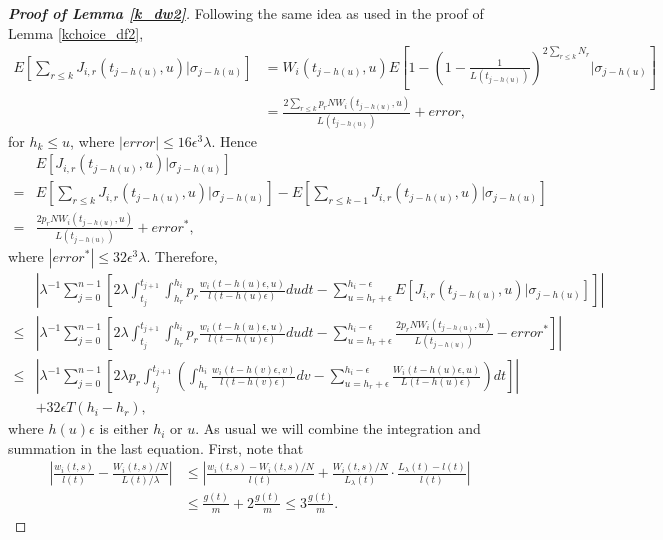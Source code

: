 \documentclass[12pt]{article}
\numberwithin{equation}{section}  %
\begin{document}
\begin{proof}[\textbf{Proof of Lemma \ref{k_dw2}}]
Following the same idea as used in the proof of Lemma \ref{kchoice_df2},
{\footnotesize
\begin{align*} 
E\left[\sum_{r\leq k}J_{i,r}(t_{j-h(u)},u)|\sigma_{j-h(u)}\right]&= W_{i}(t_{j-h(u)},u)E\left[ 
1-\left(
1-\frac{1}{L(t_{j-h(u)})}
\right)^{2\sum_{r\leq k}N_r}|\sigma_{j-h(u)}
\right]\\
&=\frac{2\sum_{r\leq k} p_r N W_{i}(t_{j-h(u)},u)}{L(t_{j-h(u)})}+error,
\end{align*}}
for $h_k\leq u$, where $|error|\leq 16\epsilon^3\lambda$. Hence 
\begin{align*} 
&E[J_{i,r}(t_{j-h(u)},u)|\sigma_{j-h(u)}]\\
=&E[\sum_{r\leq k}J_{i,r}(t_{j-h(u)},u)|\sigma_{j-h(u)}]-E[\sum_{r\leq k-1}J_{i,r}(t_{j-h(u)},u)|\sigma_{j-h(u)}]\\
=&\frac{2 p_r N W_{i}(t_{j-h(u)},u)}{L(t_{j-h(u)})}+error^*,
\end{align*}
where $|error^*|\leq 32\epsilon^3\lambda$. Therefore, 
{\footnotesize
\begin{align} 
&\left|
\lambda^{-1}\sum_{j=0}^{n-1}\left[
2\lambda\int_{t_j}^{t_{j+1}}\int_{h_r}^{h_i}p_r\frac{w_i(t-h(u)\epsilon,u)}{l(t-h(u)\epsilon)}dudt-\sum_{u=h_r+\epsilon}^{h_i-\epsilon}E[J_{i,r}(t_{j-h(u)},u)|\sigma_{j-h(u)}]\right]
\right|\nonumber\\
\leq&\left|
\lambda^{-1}\sum_{j=0}^{n-1}\left[
2\lambda\int_{t_j}^{t_{j+1}}\int_{h_r}^{h_i}p_r\frac{w_i(t-h(u)\epsilon,u)}{l(t-h(u)\epsilon)}dudt-\sum_{u=h_r+\epsilon}^{h_i-\epsilon}\frac{2p_r N W_{i}(t_{j-h(u)},u)}{L(t_{j-h(u)})}-error^*
\right]
\right|\nonumber\\
\leq&\left|
\lambda^{-1}\sum_{j=0}^{n-1}\left[
2\lambda p_r\int_{t_j}^{t_{j+1}}
\left(
\int_{h_r}^{h_i}\frac{w_i(t-h(v)\epsilon,v)}{l(t-h(v)\epsilon)}dv-\sum_{u=h_r+\epsilon}^{h_i-\epsilon}\frac{ W_{i}(t-h(u)\epsilon,u)}{L(t-h(u)\epsilon)}
\right) dt
\right]
\right|\nonumber\\
&+32\epsilon T(h_i-h_r),\label{k_dw2_pf_eq1}
\end{align}}
where $h(u)\epsilon$ is either $h_i$ or $u$. As usual we will combine the integration and summation in the last equation. First, note that
\begin{align} 
\left|\frac{w_i(t,s)}{l(t)}-\frac{W_i(t,s)/N}{L(t)/\lambda}\right|&\leq\left|
\frac{w_i(t,s)-W_i(t,s)/N}{l(t)}+\frac{W_i(t,s)/N}{L_\lambda(t)}\cdot\frac{L_{\lambda}(t)-l(t)}{l(t)}
\right|\nonumber\\
&\leq\frac{g(t)}{m}+2\frac{g(t)}{m}\leq3\frac{g(t)}{m}\label{k_dw2_pf_eq2}.
\end{align} 


\end{proof}
\end{document}
